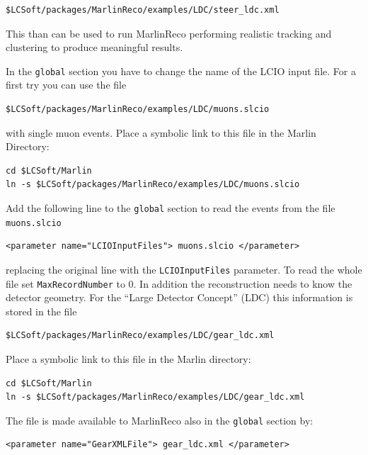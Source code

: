 \begin{verbatim}
$LCSoft/packages/MarlinReco/examples/LDC/steer_ldc.xml
\end{verbatim}

This than can be used to run MarlinReco performing realistic tracking and 
clustering to produce meaningful results. 

In the {\tt global} section you have to change the name of the 
LCIO input file. For a first try you can use the file 

\begin{verbatim}
$LCSoft/packages/MarlinReco/examples/LDC/muons.slcio
\end{verbatim}

with single muon events. Place a symbolic link to this file in the 
Marlin Directory:

\begin{verbatim}
cd $LCSoft/Marlin
ln -s $LCSoft/packages/MarlinReco/examples/LDC/muons.slcio
\end{verbatim} 

Add the following 
line to the {\tt global} section to read the events from 
the file {\tt muons.slcio}

\begin{verbatim}
<parameter name="LCIOInputFiles"> muons.slcio </parameter>
\end{verbatim}

replacing the original line with the {\tt LCIOInputFiles} parameter.
To read the whole file set {\tt MaxRecordNumber} to 0. In addition the 
reconstruction needs to know the detector geometry. 
For the ``Large Detector Concept'' (LDC) this information is stored
in the file

\begin{verbatim}
$LCSoft/packages/MarlinReco/examples/LDC/gear_ldc.xml  
\end{verbatim}

Place a symbolic link to this file in the Marlin directory:

\begin{verbatim}
cd $LCSoft/Marlin
ln -s $LCSoft/packages/MarlinReco/examples/LDC/gear_ldc.xml
\end{verbatim}

The file is made available to 
MarlinReco also in the {\tt global} section by:

\begin{verbatim}
<parameter name="GearXMLFile"> gear_ldc.xml </parameter>
\end{verbatim}

